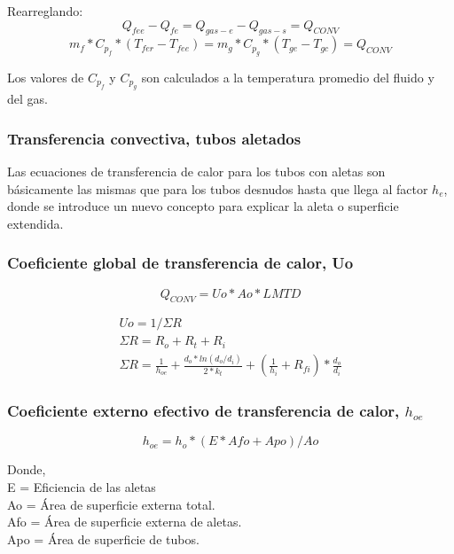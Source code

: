 \par Rearreglando:
\begin{equation*}
Q_{fee} - Q_{fe} = Q_{gas-e} - Q_{gas-s} = Q_{CONV}
\end{equation*}
\begin{equation}
\label{eq:qconv}
m_{f} *C_{p_f} *(T_{fer} - T_{fee}) = 
m_{g} *C_{p_g} *(T_{ge}  - T_{gc}) = Q_{CONV}
\end{equation}
\par Los valores de $C_{p_f}$ y $C_{p_g}$ son calculados a la temperatura promedio del fluido y del gas.

\subsubsection{Transferencia convectiva, tubos aletados}
\par Las ecuaciones de transferencia de calor para los tubos con aletas son básicamente las mismas que para los tubos desnudos hasta que llega al factor $h_e$, donde se introduce un nuevo concepto para explicar la aleta o superficie extendida.

\subsubsection{Coeficiente global de transferencia de calor, Uo}

\begin{equation}
Q_{CONV} = Uo *Ao *LMTD
\end{equation}

\begin{gather*}
\label{}
Uo  = 1 / \Sigma R \\
\Sigma R = R_o + R_t + R_i \\
\Sigma R =  \frac{1}{h_{oe}} 
            +\frac{d_o*ln(d_o/d_i)}{2*k_t} 
            +(\frac{1}{h_i}+R_{fi})*\frac{d_o}{d_i} 
\end{gather*}

\subsubsection{Coeficiente externo efectivo de transferencia de calor, $h_{oe}$}
\begin{equation*}
h_{oe} = h_o * (E *Afo +Apo) / Ao
\end{equation*}

\par Donde,\\
E = Eficiencia de las aletas\\
Ao = Área de superficie externa total.\\
Afo = Área de superficie externa de aletas. \\
Apo = Área de superficie de tubos. \\

